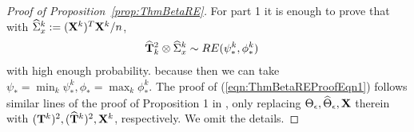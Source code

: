 \documentclass[12pt, letterpaper]{article}
\theoremstyle{definition}
\numberwithin{equation}{section}
\begin{document}
\begin{proof}[Proof of Proposition~\ref{prop:ThmBetaRE}]
For part 1 it is enough to prove that with $ \widehat \Sigma_x^k := ({\mathbf{X}}^k)^T {\mathbf{X}}^k/n$,
%
\begin{align}\label{eqn:ThmBetaREProofEqn1}
\widehat {{\mathbf{T}}}_k^2 \otimes \widehat \Sigma_x^k & \sim RE (\psi_*^k, \phi_*^k)
\end{align}
%
with high enough probability. because then we can take $\psi_* = \min_k \psi_*^k, \phi_* = \max_k \phi_*^k$. The proof of (\ref{eqn:ThmBetaREProofEqn1}) follows similar lines of the proof of Proposition 1 in \cite{LinEtal16}, only replacing $\Theta_\epsilon, \widehat \Theta_\epsilon, {\mathbf{X}}$ therein with $({\mathbf{T}}^k)^2, (\widehat {{\mathbf{T}}}^k)^2, {\mathbf{X}}^k$, respectively. We omit the details.%
%

\end{proof}
\end{document}
